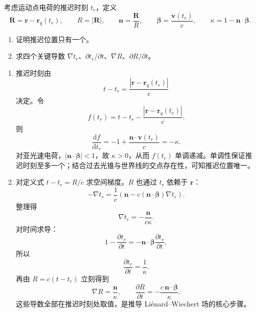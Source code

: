 \begin{question}
考虑运动点电荷的推迟时刻 $t_r$，定义
\[
  \mathbf R=\mathbf r-\mathbf r_q(t_r),
  \qquad R=|\mathbf R|,
  \qquad \mathbf n=\frac{\mathbf R}{R},
  \qquad \boldsymbol\beta=\frac{\mathbf v(t_r)}{c},
  \qquad \kappa=1-\mathbf n\cdot\boldsymbol\beta .
\]
\begin{enumerate}
  \item 证明推迟位置只有一个。
  \item 求四个关键导数 $\nabla t_r$、$\partial t_r/\partial t$、$\nabla R$、$\partial R/\partial t$。
\end{enumerate}
\begin{solution}
\begin{enumerate}
  \item 推迟时刻由
  \[
    t-t_r=\frac{|\mathbf r-\mathbf r_q(t_r)|}{c}
  \]
  决定。令
  \[
    f(t_r)=t-t_r-\frac{|\mathbf r-\mathbf r_q(t_r)|}{c} .
  \]
  则
  \[
    \frac{\mathrm df}{\mathrm dt_r}
    =-1+\frac{\mathbf n\cdot\mathbf v(t_r)}{c}
    =-\kappa .
  \]
  对亚光速电荷，$|\mathbf n\cdot\boldsymbol\beta|<1$，故 $\kappa>0$，从而 $f(t_r)$ 单调递减。单调性保证推迟时刻至多一个；结合过去光锥与世界线的交点存在性，可知推迟位置唯一。

  \item 对定义式 $t-t_r=R/c$ 求空间梯度。$R$ 也通过 $t_r$ 依赖于 $\mathbf r$：
  \[
    -\nabla t_r=\frac1c\left(\mathbf n-c(\mathbf n\cdot\boldsymbol\beta)\nabla t_r\right).
  \]
  整理得
  \[
    \boxed{\nabla t_r=-\frac{\mathbf n}{c\kappa}} .
  \]
  对时间求导：
  \[
    1-\frac{\partial t_r}{\partial t}
    =-\mathbf n\cdot\boldsymbol\beta\frac{\partial t_r}{\partial t},
  \]
  所以
  \[
    \boxed{\frac{\partial t_r}{\partial t}=\frac1\kappa} .
  \]
  再由 $R=c(t-t_r)$ 立刻得到
  \[
    \boxed{\nabla R=\frac{\mathbf n}{\kappa}},
    \qquad
    \boxed{\frac{\partial R}{\partial t}=-\frac{c\,\mathbf n\cdot\boldsymbol\beta}{\kappa}} .
  \]
  这些导数全部在推迟时刻处取值，是推导 Liénard--Wiechert 场的核心步骤。
\end{enumerate}
\end{solution}
\end{question}

